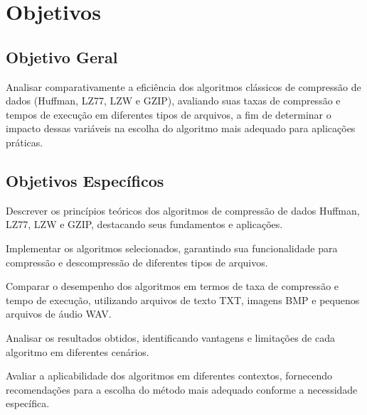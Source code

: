 \chapter{Objetivos}
\label{c.objetivos}

\section{Objetivo Geral}

Analisar comparativamente a eficiência dos algoritmos clássicos de compressão de dados (Huffman, LZ77, LZW e GZIP), avaliando suas taxas de compressão e tempos de execução em diferentes tipos de arquivos, a fim de determinar o impacto dessas variáveis na escolha do algoritmo mais adequado para aplicações práticas.

\section{Objetivos Específicos}

\begin{alineas}
	\item Descrever os princípios teóricos dos algoritmos de compressão de dados Huffman, LZ77, LZW e GZIP, destacando seus fundamentos e aplicações.
	\item Implementar os algoritmos selecionados, garantindo sua funcionalidade para compressão e descompressão de diferentes tipos de arquivos.
	\item Comparar o desempenho dos algoritmos em termos de taxa de compressão e tempo de execução, utilizando arquivos
    de texto TXT, imagens BMP e pequenos arquivos de áudio WAV.
	\item Analisar os resultados obtidos, identificando vantagens e limitações de cada algoritmo em diferentes cenários.
	\item Avaliar a aplicabilidade dos algoritmos em diferentes contextos, fornecendo recomendações para a escolha do método mais adequado conforme a necessidade específica.
\end{alineas}
